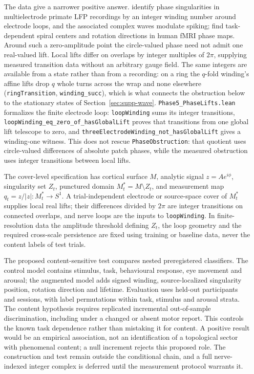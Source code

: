 \documentclass{article}
\renewcommand{\cite}[1]{\citep{#1}}
\begin{document}
The data give a narrower positive answer. \cite{townsend2015} identify phase singularities in multielectrode primate LFP recordings by an integer winding number around electrode loops, and the associated complex waves modulate spiking; \cite{xu2023} find task-dependent spiral centers and rotation directions in human fMRI phase maps. Around such a zero-amplitude point the circle-valued phase need not admit one real-valued lift. Local lifts differ on overlaps by integer multiples of $2\pi$, supplying measured transition data without an arbitrary gauge field. The same integers are available from a state rather than from a recording: on a ring the $q$-fold winding's affine lifts drop $q$ whole turns across the wrap and none elsewhere (\nolinkurl{ringTransition}, \nolinkurl{winding_succ}), which is what connects the obstruction below to the stationary states of Section~\ref{sec:supp-wave}. \nolinkurl{Phase5_PhaseLifts.lean} formalizes the finite electrode loop: \texttt{loopWinding} sums its integer transitions, \nolinkurl{loopWinding_eq_zero_of_hasGlobalLift} proves that transitions from one global lift telescope to zero, and \nolinkurl{threeElectrodeWinding_not_hasGlobalLift} gives a winding-one witness. This does not rescue \texttt{PhaseObstruction}: that quotient uses circle-valued differences of absolute patch phases, while the measured obstruction uses integer transitions between local lifts.

The cover-level specification has cortical surface $M$, analytic signal $z=Ae^{i\phi}$, singularity set $Z_t$, punctured domain $M^\ast_t=M\setminus Z_t$, and measurement map $q_t=z/|z|:M^\ast_t\to S^1$. A trial-independent electrode or source-space cover of $M^\ast_t$ supplies local real lifts; their differences divided by $2\pi$ are integer transitions on connected overlaps, and nerve loops are the inputs to \texttt{loopWinding}. In finite-resolution data the amplitude threshold defining $Z_t$, the loop geometry and the required cross-scale persistence are fixed using training or baseline data, never the content labels of test trials.

The proposed content-sensitive test compares nested preregistered classifiers. The control model contains stimulus, task, behavioural response, eye movement and arousal; the augmented model adds signed winding, source-localized singularity position, rotation direction and lifetime. Evaluation uses held-out participants and sessions, with label permutations within task, stimulus and arousal strata. The content hypothesis requires replicated incremental out-of-sample discrimination, including under a changed or absent motor report. This controls the known task dependence rather than mistaking it for content. A positive result would be an empirical association, not an identification of a topological sector with phenomenal content; a null increment rejects this proposed role. The construction and test remain outside the conditional chain, and a full nerve-indexed integer complex is deferred until the measurement protocol warrants it.
\end{document}
